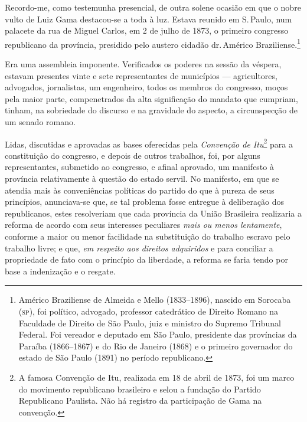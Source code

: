 Recordo-me, como testemunha presencial, de outra solene ocasião em que o
nobre vulto de Luiz Gama destacou-se a toda à luz. Estava reunido em S.\,Paulo, num palacete da rua de Miguel Carlos, em 2 de julho de 1873, o
primeiro congresso republicano da província, presidido pelo austero
cidadão dr.\,Américo Braziliense.\footnote{Américo Braziliense de
  Almeida e Mello (1833--1896), nascido em Sorocaba (\textsc{sp}), foi político,
  advogado, professor catedrático de Direito Romano na Faculdade de
  Direito de São Paulo, juiz e ministro do Supremo Tribunal Federal. Foi 
  vereador e deputado em São Paulo, presidente das províncias da Paraíba
  (1866--1867) e do Rio de Janeiro (1868) e o primeiro governador do
  estado de São Paulo (1891) no período republicano.}

Era uma assembleia imponente. Verificados os poderes na sessão da
véspera, estavam presentes vinte e sete representantes de municípios
--- agricultores, advogados, jornalistas, um engenheiro, todos os
membros do congresso, moços pela maior parte, compenetrados da alta
significação do mandato que cumpriam, tinham, na sobriedade do discurso
e na gravidade do aspecto, a circunspecção de um senado romano.

Lidas, discutidas e aprovadas as bases oferecidas pela \emph{Convenção
de Itu}\footnote{A famosa Convenção de Itu, realizada em 18 de abril
  de 1873, foi um marco do movimento republicano brasileiro e selou a
  fundação do Partido Republicano Paulista. Não há registro da
  participação de Gama na convenção.} para a constituição do congresso,
e depois de outros trabalhos, foi, por alguns representantes, submetido
ao congresso, e afinal aprovado, um manifesto à província relativamente
à questão do estado servil. No manifesto, em que se atendia mais às
conveniências políticas do partido do que à pureza de seus princípios,
anunciava-se que, se tal problema fosse entregue à deliberação dos
republicanos, estes resolveriam que cada província da União Brasileira
realizaria a reforma de acordo com seus interesses peculiares \emph{mais
ou menos lentamente}, conforme a maior ou menor facilidade na
substituição do trabalho escravo pelo trabalho livre; e que, \emph{em
respeito aos direitos adquiridos} e para conciliar a propriedade de fato
com o princípio da liberdade, a reforma se faria tendo por base a
indenização e o resgate.

